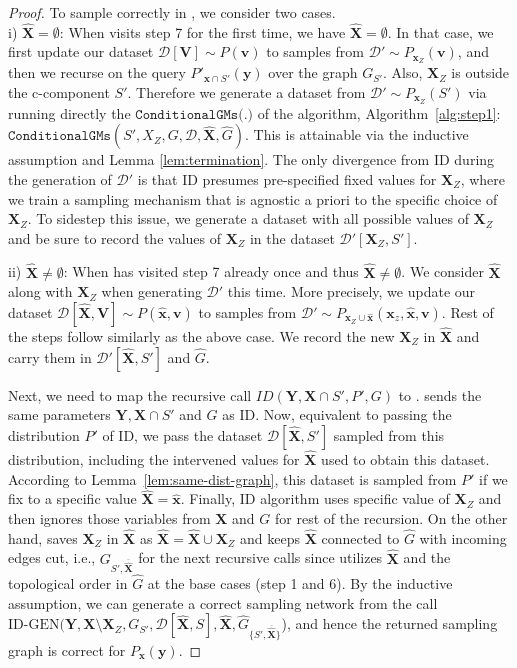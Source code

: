 \documentclass{article}
\newcommand{\x}{\mathbf{x}}
\newcommand{\y}{\mathbf{y}}
\newcommand{\X}{\mathbf{X}}
\newcommand{\Xp}{{\hat{\mathbf{X}}}}
\newcommand{\xp}{{\hat{\mathbf{x}}}}
\newcommand{\Gp}{{\hat{{G}}}}
\newcommand{\Y}{\mathbf{Y}}
\newcommand{\V}{\mathbf{V}}
\newcommand{\vb}{\mathbf{v}}
\newcommand{\mbf}{\mathbf}
\newcommand{\data}{\mathcal{D}}
\newcommand{\idgen}{\text{ID-GEN}\xspace}
\newcommand{\condgm}{\texttt{ConditionalGMs(.)}\xspace}
\theoremstyle{plain}
\theoremstyle{definition}
\theoremstyle{remark}
\begin{document}
\begin{proof}
 To sample correctly in \idgen, we consider two cases.\\
 i) $\Xp=\emptyset$: When \idgen visits step 7 for the first time, we have $\Xp=\emptyset$. In that case,  we first update our dataset $\data[\V]\sim P(\vb)$ to samples from $\data'\sim P_{\x_Z}( \vb)$, and then we recurse on the query $P'_{\x\cap S'}(\y)$ over the graph $G_{S'}$.
Also, $\X_Z$ is outside the c-component $S'$. Therefore we generate a dataset from $\data'\sim P_{\x_Z}(S')$ via running directly the $\condgm$ of the \idgen algorithm, Algorithm~\ref{alg:step1}: 
$\texttt{ConditionalGMs}(S', X_Z, G, \data, \Xp, \Gp)$. This is attainable via the inductive assumption and Lemma \ref{lem:termination}. The only divergence from ID during the generation of $\data'$ is that ID presumes pre-specified fixed values for $\X_Z$, where we train a sampling mechanism that is agnostic a priori to the specific choice of $\X_Z$. To sidestep this issue, we generate a dataset with all possible values of $\X_Z$ and be sure to record the values of $\X_Z$ in the dataset $\data'[\X_Z, S']$. 

ii) $\Xp \neq \emptyset$:  When \idgen has visited step 7 already once and thus $\Xp\neq \emptyset$. We consider $\Xp$ along with $\X_Z$ when generating $\data'$ this time. 
More precisely, we update our dataset $\data[\Xp, \V]\sim P(\xp, \vb)$ to samples from $\data'\sim P_{\x_Z \cup \xp}(\x_z, \xp, \vb)$.
Rest of the steps follow similarly as the above case. We record the new $\X_Z$ in $\Xp$ and carry them in $\data'[\Xp, S']$ and $\Gp$.

  
		Next, we need to map the recursive call $ID(\Y, \X\cap S', P', G)$ to \idgen. \idgen sends the same parameters $\Y, \X\cap S'$ and $G$ as ID.  Now, equivalent to passing the distribution $P'$ of ID, we pass the dataset  $\data[\Xp, S']$ sampled from this distribution, including the intervened values for $\Xp$ used to obtain this dataset. According to Lemma~\ref{lem:same-dist-graph}, this dataset is sampled from $P'$ if we fix to a specific value $\Xp= \xp$. Finally, ID algorithm uses specific value of $\X_Z$ and then ignores those variables from $\X$ and $G$ for rest of the recursion. On the other hand, \idgen saves $\X_Z$ in $\Xp$ as $\Xp= \Xp \cup \X_Z$ and keeps $\Xp$ connected to $\Gp$ with incoming edges cut, i.e.,  $G_{S',\overline{\Xp}}$ for the next recursive calls since \idgen utilizes $\Xp$ and the topological order in $\Gp$ at the base cases (step 1 and 6).
		By the inductive assumption, we can generate a correct sampling network from the call $\idgen(\mbf{Y}, \mbf{X} \setminus \X_Z , G_{S'},
		\data[\Xp, S], {\Xp},  \Gp_{\{S', \overline{\Xp}\}} $), and hence the returned sampling graph is correct for $P_{\x}(\y).$
		

\end{proof}
\end{document}
